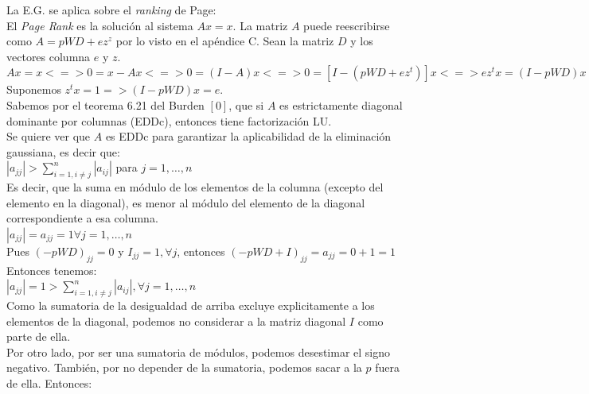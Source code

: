 		La E.G. se aplica sobre el \textit{ranking} de Page: \\

		El \textit{Page Rank} es la solución al sistema $Ax=x$. La matriz $A$ puede reescribirse como $A=pWD+ez^{z}$ por lo visto en el apéndice C. Sean la matriz $D$ y los vectores columna $e$ y $z$. \\

		$Ax=x <=> 0 = x-Ax <=> 0 = (I-A)x <=> 0 = [I - (pWD+ez^{t})]x <=> ez^{t}x = (I-pWD)x$ \\

		Suponemos $z^{t}x = 1 => (I-pWD)x = e$. \\

		Sabemos por el teorema 6.21 del Burden $[0]$, que si $A$ es estrictamente diagonal dominante por columnas (EDDc), entonces tiene factorización LU. \\ %

		Se quiere ver que $A$ es EDDc para garantizar la aplicabilidad de la eliminación gaussiana, es decir que: \\

		$|a_{jj}| > \sum^{n}_{i=1, i \neq j} |a_{ij}|$ para $j = 1, \hdots, n$ \\

		Es decir, que la suma en módulo de los elementos de la columna (excepto del elemento en la diagonal), es menor al módulo del elemento de la diagonal correspondiente a esa columna. \\

		$|a_{jj}| = a_{jj} = 1 \forall j = 1, \hdots, n$ \\

		Pues $(-pWD)_{jj} = 0$ y $I_{jj} = 1, \forall j$, entonces $(-pWD + I)_{jj} = a_{jj} = 0 + 1 = 1$ \\

		Entonces tenemos: \\

		$|a_{jj}| = 1 > \sum_{i=1, i \neq j}^{n} |a_{ij}|, \forall j = 1, \hdots, n$ \\

		Como la sumatoria de la desigualdad de arriba excluye explicitamente a los elementos de la diagonal, podemos no considerar a la matriz diagonal $I$ como parte de ella. \\

		Por otro lado, por ser una sumatoria de módulos, podemos desestimar el signo negativo. También, por no depender de la sumatoria, podemos sacar a la $p$ fuera de ella. Entonces: \\

